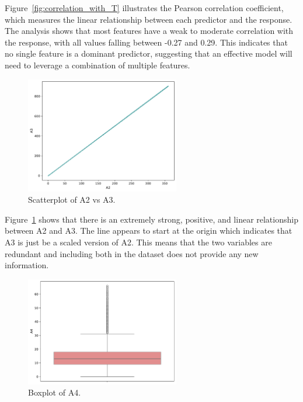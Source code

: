 \documentclass[11pt]{report}
\begin{document}
Figure~\ref{fig:correlation_with_T} illustrates the Pearson correlation coefficient, which measures the linear relationship between each predictor and the response. The analysis shows that most features have a weak to moderate correlation with the response, with all values falling between -0.27 and 0.29. This indicates that no single feature is a dominant predictor, suggesting that an effective model will need to leverage a combination of multiple features.

\begin{figure}[H]
    \centering
    \includegraphics[width=0.6\textwidth]{images/A2_vs_A3_scatterplot.pdf}
    \caption{Scatterplot of A2 vs A3.}
    \label{fig:A2_vs_A3_scatterplot}
\end{figure}

Figure~\ref{fig:A2_vs_A3_scatterplot} shows that there is an extremely strong, positive, and linear relationship between A2 and A3. The line appears to start at the origin which indicates that A3 is just be a scaled version of A2. This means that the two variables are redundant and including both in the dataset does not provide any new information.

\begin{figure}[H]
    \centering
    \includegraphics[width=0.6\textwidth]{images/A4_boxplot.pdf}
    \caption{Boxplot of A4.}
    \label{fig:a4_boxplot}
\end{figure}
\end{document}
